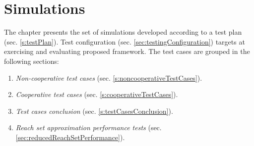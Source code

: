 \cleardoublepage
\chapter{Simulations}\label{Simulations}


\noindent The chapter presents the set of simulations developed according to a test plan (sec. \ref{s:testPlan}). Test configuration (sec. \ref{sec:testingConfiguration}) targets at exercising and evaluating proposed framework. The test cases are grouped in the following sections:
\begin{enumerate}
    \item \emph{Non-cooperative test cases} (sec. \ref{s:noncooperativeTestCases}).
    \item \emph{Cooperative test cases} (sec. \ref{s:cooperativeTestCases}).
    \item \emph{Test cases conclusion} (sec. \ref{s:testCasesConclusion}).
    \item \emph{Reach set approximation performance tests} (sec. \ref{sec:reducedReachSetPerformance}).
\end{enumerate}